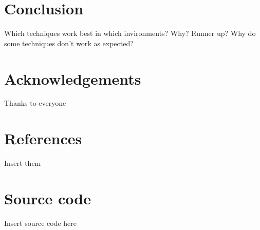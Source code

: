 \documentclass[10pt,a4paper]{article}
\begin{document}
\section{Conclusion}
Which techniques work best in which invironments? Why? Runner up? Why do some techniques don't work as expected?

\section*{Acknowledgements}
Thanks to everyone

\section*{References}
Insert them

\appendix
\appendixpage
\addappheadtotoc
\section{Source code}
Insert source code here
\end{document}
